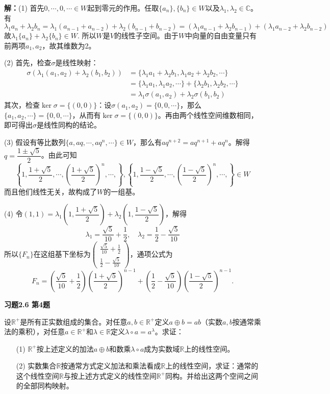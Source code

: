 {\bf 解：}(1) 首先${0,\cdots,0,\cdots}\in W$起到零元的作用。任取$\{a_n\} , \{b_n\} \in W$以及$\lambda_1,\lambda_2\in\mathbb{C}$。有
$$\lambda_1 a_n + \lambda_2 b_n = \lambda_1 (a_{n-1}+a_{n-2}) + \lambda_2 (b_{n-1}+b_{n-2}) = (\lambda_1 a_{n-1} + \lambda_2 b_{n-1}) + (\lambda_1 a_{n-2} + \lambda_2 b_{n-2})$$
故$\lambda_1\{a_n\} + \lambda_2\{b_n\} \in W$. 所以$W$是$V$的线性子空间。由于$W$中向量的自由变量只有前两项$a_1,a_2$，故其维数为2。

(2) 首先，检查$\sigma$是线性映射：
\begin{align*}
\sigma(\lambda_1(a_1,a_2)+\lambda_2(b_1,b_2)) & = \{\lambda_1a_1+\lambda_2b_1, \lambda_1a_2+\lambda_2b_2,\cdots\} \\
& = \{\lambda_1a_1, \lambda_1a_2,\cdots\} + \{\lambda_2b_1, \lambda_2b_2,\cdots\} \\
& = \lambda_1\sigma(a_1,a_2) + \lambda_2\sigma(b_1,b_2)
\end{align*}
其次，检查$\ker\sigma = \{(0,0)\}$：设$\sigma(a_1,a_2) = \{0,0,\cdots\}$，那么$\{a_1,a_2,\cdots\} = \{0,0,\cdots\}$，从而有$\ker\sigma = \{(0,0)\}$。再由两个线性空间维数相同，即可得出$\sigma$是线性同构的结论。

(3) 假设有等比数列$\{a,aq,\cdots,aq^n,\cdots\}\in W$，那么有$aq^{n+2} = aq^{n+1} + aq^{n}$。解得$q = \dfrac{1\pm\sqrt{5}}{2}$。由此可知
$$\left\{1, \dfrac{1+\sqrt{5}}{2}, \cdots, \left(\dfrac{1+\sqrt{5}}{2}\right)^n, \cdots, \right\}, \left\{1, \dfrac{1-\sqrt{5}}{2}, \cdots, \left(\dfrac{1-\sqrt{5}}{2}\right)^n, \cdots, \right\} \in W$$
而且他们线性无关，故构成了$W$的一组基。

(4) 令$(1,1) = \lambda_1 \left(1, \dfrac{1+\sqrt{5}}{2}\right) + \lambda_2 \left(1, \dfrac{1-\sqrt{5}}{2}\right)$，解得
$$\lambda_1 = \frac{\sqrt{5}}{10} + \frac{1}{2}, \quad \lambda_2 = \frac{1}{2} - \frac{\sqrt{5}}{10}$$
所以$\{F_n\}$在这组基下坐标为$\begin{pmatrix}\frac{\sqrt{5}}{10} + \frac{1}{2}\\\frac{1}{2} - \frac{\sqrt{5}}{10}\end{pmatrix}$，通项公式为
$$F_n = \left( \frac{\sqrt{5}}{10} + \frac{1}{2} \right) \left( \dfrac{1+\sqrt{5}}{2} \right)^{n-1} + \left( \frac{1}{2} - \frac{\sqrt{5}}{10} \right) \left( \dfrac{1-\sqrt{5}}{2} \right)^{n-1}.$$

\newpageorvspace

{\bf 习题2.6 第4题}

设$\mathbb{R}^+$是所有正实数组成的集合。对任意$a,b\in\mathbb{R}^+$定义$a\oplus b = ab$（实数$a,b$按通常乘法的乘积），对任意$a\in\mathbb{R}^+$和$\lambda\in\mathbb{R}$定义$\lambda\circ a = a^{\lambda}$。求证：
\begin{itemize}
\item[(1)] $\mathbb{R}^+$按上述定义的加法$a\oplus b$和数乘$\lambda\circ a$成为实数域$\mathbb{R}$上的线性空间。
\item[(2)] 实数集合$\mathbb{R}$按通常方式定义加法和乘法看成$\mathbb{R}$上的线性空间，求证：通常的这个线性空间$\mathbb{R}$与按上述方式定义的线性空间$\mathbb{R}^+$同构。并给出这两个空间之间的全部同构映射。
\end{itemize}

